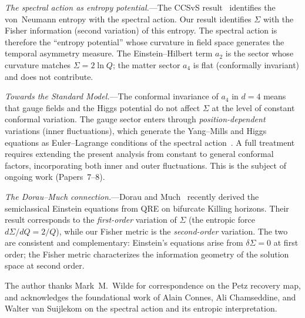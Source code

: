 \documentclass[prl,twocolumn,superscriptaddress,longbibliography]{revtex4-2}
\begin{document}
\emph{The spectral action as entropy potential.}---The
CCSvS result~\cite{CCSvS2018} identifies the
von~Neumann entropy with the spectral action.
Our result identifies $\Sigma$ with the Fisher
information (second variation) of this entropy.
The spectral action is therefore the
``entropy potential'' whose curvature
in field space generates the temporal asymmetry
measure.
The Einstein--Hilbert term $a_2$ is the sector
whose curvature matches $\Sigma = 2\ln Q$;
the matter sector $a_4$ is flat (conformally
invariant) and does not contribute.

\emph{Towards the Standard Model.}---The
conformal invariance of $a_4$ in $d=4$ means that
gauge fields and the Higgs potential do not
affect $\Sigma$ at the level of constant
conformal variation.
The gauge sector enters through
\emph{position-dependent} variations
(inner fluctuations), which generate the
Yang--Mills and Higgs equations as
Euler--Lagrange conditions of the spectral
action~\cite{CC1996,vS2024}.
A full treatment requires extending the present
analysis from constant to general conformal
factors, incorporating both inner and outer
fluctuations.
This is the subject of ongoing work (Papers~7--8).

\emph{The Dorau--Much connection.}---Dorau and
Much~\cite{DorauMuch2025} recently derived the
semiclassical Einstein equations from QRE on
bifurcate Killing horizons.
Their result corresponds to the \emph{first-order}
variation of $\Sigma$ (the entropic force
$d\Sigma/dQ = 2/Q$), while our Fisher metric
is the \emph{second-order} variation.
The two are consistent and complementary:
Einstein's equations arise from $\delta\Sigma = 0$
at first order; the Fisher metric characterizes
the information geometry of the solution space
at second order.


\begin{acknowledgments}
The author thanks Mark~M.~Wilde for correspondence
on the Petz recovery map, and acknowledges the
foundational work of Alain Connes, Ali Chamseddine,
and Walter van Suijlekom on the spectral action
and its entropic interpretation.
\end{acknowledgments}
\end{document}
